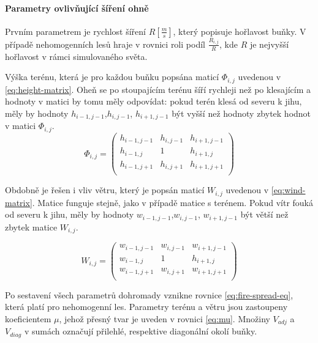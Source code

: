 \documentclass[11pt,a4paper]{scrartcl}
\begin{document}
	\paragraph{Parametry ovlivňující šíření ohně} Prvním parametrem je rychlost šíření $R [\frac{m}{s}]$, který popisuje hořlavost buňky. V případě nehomogenních lesů hraje v rovnici roli podíl $\frac{R_{i,j}}{R}$, kde $R$ je nejvyšší hořlavost v rámci simulovaného světa.
	
	Výška terénu, která je pro každou buňku popsána maticí $\Phi_{i,j}$ uvedenou v \ref{eq:height-matrix}. Oheň se po stoupajícím terénu šíří rychleji než po klesajícím \cite{source_article} a hodnoty v matici by tomu měly odpovídat: pokud terén klesá od severu k jihu, měly by hodnoty $h_{i-1,j-1}$,$h_{i,j-1}$, $h_{i+1,j-1}$ být vyšší než hodnoty zbytek hodnot v matici $\Phi_{i,j}$.
\begin{equation}
	\Phi_{i,j} =
	\begin{pmatrix}
	h_{i-1,j-1}       & h_{i,j-1} & h_{i+1,j-1} \\
	h_{i-1,j}       & 1 & h_{i+1,j} \\
	h_{i-1,j+1}       & h_{i,j+1} & h_{i+1,j+1} \\
	\end{pmatrix}
	\label{eq:height-matrix}
\end{equation}	
	
	Obdobně je řešen i vliv větru, který je popsán maticí $W_{i,j}$ uvedenou v \ref{eq:wind-matrix}. Matice funguje stejně, jako v případě matice s terénem. Pokud vítr fouká od severu k jihu, měly by hodnoty $w_{i-1,j-1}$,$w_{i,j-1}$, $w_{i+1,j-1}$ být větší než zbytek matice $W_{i,j}$.
	
	\begin{equation}
	W_{i,j} =
	\begin{pmatrix}
	w_{i-1,j-1}       & w_{i,j-1} & w_{i+1,j-1} \\
	w_{i-1,j}       & 1 & h_{i+1,j} \\
	w_{i-1,j+1}       & w_{i,j+1} & w_{i+1,j+1} \\
	\end{pmatrix}
	\label{eq:wind-matrix}
	\end{equation}	
	
	Po sestavení všech parametrů dohromady vznikne rovnice \ref{eq:fire-spread-eq}, která platí pro nehomogenní les. Parametry terénu a větru jsou zastoupeny koeficientem $\mu$, jehož přesný tvar je uveden v rovnici \ref{eq:mu}. Množiny $V_{adj}$ a $V_{diag}$ v sumách označují přilehlé, respektive diagonální okolí buňky.
	
\end{document}
